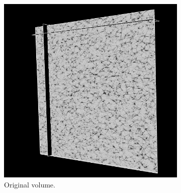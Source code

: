 

\begin{figure}[H]
  \centering
  \begin{subfigure}{0.5\textwidth}
    \centering
    \includegraphics[width=0.9\linewidth]{Figures/chapter-image/pipeline_screenshots/actin_volume.png}
    \caption{Original volume.}
    \label{fig:actin_original}
  \end{subfigure}%
  \begin{subfigure}{0.5\textwidth}
    \centering

\end{subfigure}
\end{figure}
